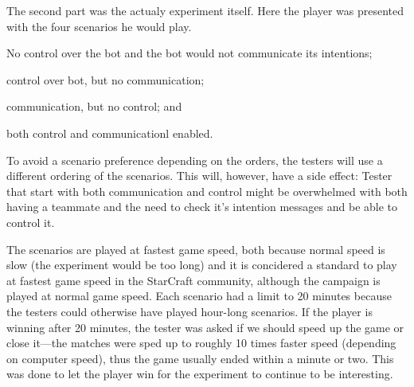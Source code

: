 The second part was the actualy experiment itself. Here the player was presented with the four scenarios he would play.
\begin{inparaenum}[1\upshape)]
	\item No control over the bot and the bot would not communicate its intentions;
	\item control over bot, but no communication;
	\item communication, but no control; and
	\item both control and communicationl enabled.
\end{inparaenum}
To avoid a scenario preference depending on the orders, the testers will use a different ordering of the scenarios. This will, however, have a side effect: Tester that start with both communication and control might be overwhelmed with both having a teammate and the need to check it’s intention messages and be able to control it.

The scenarios are played at fastest game speed, both because normal speed is slow (the experiment would be too long) and it is concidered a standard to play at fastest game speed in the StarCraft community, although the campaign is played at normal game speed. Each scenario had a limit to 20 minutes because the testers could otherwise have played hour-long scenarios. If the player is winning after 20 minutes, the tester was asked if we should speed up the game or close it—the matches were sped up to roughly 10 times faster speed (depending on computer speed), thus the game usually ended within a minute or two. This was done to let the player win for the experiment to continue to be interesting.